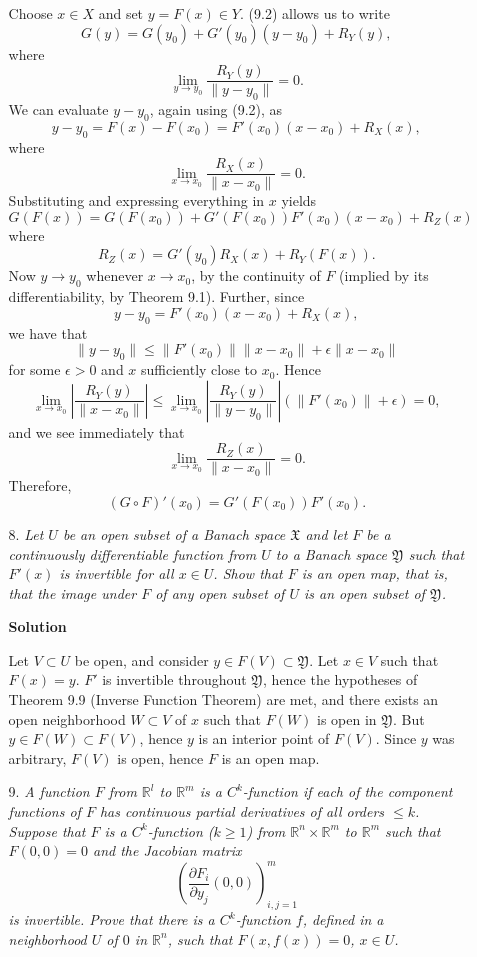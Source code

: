 \documentclass{article}
\begin{document}
\begin{enumerate}
\begin{itemize}
Choose \(x \in X\) and set \(y = F(x) \in Y\).  (9.2) allows us to write
\[G(y) = G(y_0) + G'(y_0) (y - y_0) + R_Y(y),\]
where
\[\lim_{y \to y_0} \frac{R_Y(y)}{\|y - y_0\|} = 0.\]
We can evaluate \(y - y_0\), again using (9.2), as
\[y - y_0 = F(x) - F(x_0) = F'(x_0) (x - x_0) + R_X(x),\]
where
\[\lim_{x \to x_0} \frac{R_X(x)}{\|x - x_0\|} = 0.\]
Substituting and expressing everything in \(x\) yields
\[G(F(x)) = G(F(x_0)) + G'(F(x_0)) F'(x_0) (x - x_0) + R_Z(x)\]
where
\[R_Z(x) = G'(y_0) R_X(x) + R_Y(F(x)).\]
Now \(y \to y_0\) whenever \(x \to x_0\), by the continuity of \(F\) (implied by its differentiability, by Theorem 9.1).  Further, since
\[y - y_0 = F'(x_0) (x - x_0) + R_X(x),\]
we have that
\[\|y - y_0\| \leq \|F'(x_0)\| \|x - x_0\| + \epsilon \|x - x_0\|\]
for some \(\epsilon > 0\) and \(x\) sufficiently close to \(x_0\).  Hence
\[\lim_{x \to x_0} \left| \frac{R_Y(y)}{\|x - x_0\|} \right|
  \leq \lim_{x \to x_0} \left| \frac{R_Y(y)}{\|y - y_0\|} \right| \left( \|F'(x_0)\| + \epsilon \right)
     = 0,\]
and we see immediately that
\[\lim_{x \to x_0} \frac{R_Z(x)}{\|x - x_0\|} = 0.\]
Therefore,
\[(G \circ F)'(x_0) = G'(F(x_0)) F'(x_0).\]



\item[8.] {\em Let \(U\) be an open subset of a Banach space \(\mathfrak{X}\) and let \(F\) be a continuously differentiable function from \(U\) to a Banach space \(\mathfrak{Y}\) such that \(F'(x)\) is invertible for all \(x \in U\).  Show that \(F\) is an open map, that is, that the image under \(F\) of any open subset of \(U\) is an open subset of \(\mathfrak{Y}\).}

{\bf Solution}

Let \(V \subset U\) be open, and consider \(y \in F(V) \subset \mathfrak{Y}\).  Let \(x \in V\) such that \(F(x) = y\).  \(F'\) is invertible throughout \(\mathfrak{Y}\), hence the hypotheses of Theorem 9.9 (Inverse Function Theorem) are met, and there exists an open neighborhood \(W \subset V\) of \(x\) such that \(F(W)\) is open in \(\mathfrak{Y}\).  But \(y \in F(W) \subset F(V)\), hence \(y\) is an interior point of \(F(V)\).  Since \(y\) was arbitrary, \(F(V)\) is open, hence \(F\) is an open map.



\item[9.] {\em A function \(F\) from \(\mathbb{R}^l\) to \(\mathbb{R}^m\) is a \(C^k\)-{\em function} if each of the component functions of \(F\) has continuous partial derivatives of all orders \(\leq k\).  Suppose that \(F\) is a \(C^k\)-function (\(k \geq 1\)) from \(\mathbb{R}^n \times \mathbb{R}^m\) to \(\mathbb{R}^m\) such that \(F(0,0) = 0\) and the Jacobian matrix
\[\left( \frac{\partial F_i}{\partial y_j}(0,0) \right)_{i,j = 1}^m\]
is invertible.  Prove that there is a \(C^k\)-function \(f\), defined in a neighborhood \(U\) of \(0\) in \(\mathbb{R}^n\), such that \(F(x,f(x)) = 0\), \(x \in U\).}


\end{itemize}
\end{enumerate}
\end{document}
